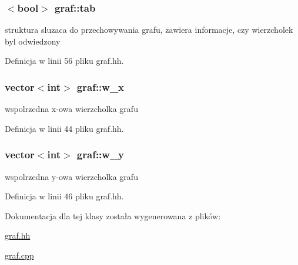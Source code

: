 \hypertarget{classgraf_a563284d00331e414f9d124da73e43dd6}{
\subsubsection[{tab}]{$<$bool$>$ graf\-::tab\hspace{0.3cm}{\ttfamily [private]}}}\label{classgraf_a563284d00331e414f9d124da73e43dd6}


struktura sluzaca do przechowywania grafu, zawiera informacje, czy wierzcholek byl odwiedzony 



Definicja w linii 56 pliku graf.\-hh.

\hypertarget{classgraf_add49fee88b9df326c31bb81318f8bb39}{
\subsubsection[{w\-\_\-x}]{\setlength{\rightskip}{0pt plus 5cm}vector$<$int$>$ graf\-::w\-\_\-x\hspace{0.3cm}{\ttfamily [private]}}}\label{classgraf_add49fee88b9df326c31bb81318f8bb39}


wspolrzedna x-\/owa wierzcholka grafu 



Definicja w linii 44 pliku graf.\-hh.

\hypertarget{classgraf_a43cbf9a972dc7cad492fb8fc811a51d1}{
\subsubsection[{w\-\_\-y}]{\setlength{\rightskip}{0pt plus 5cm}vector$<$int$>$ graf\-::w\-\_\-y\hspace{0.3cm}{\ttfamily [private]}}}\label{classgraf_a43cbf9a972dc7cad492fb8fc811a51d1}


wspolrzedna y-\/owa wierzcholka grafu 



Definicja w linii 46 pliku graf.\-hh.



Dokumentacja dla tej klasy została wygenerowana z plików\-:\begin{DoxyCompactItemize}
\item 
\hyperlink{graf_8hh}{graf.\-hh}\item 
\hyperlink{graf_8cpp}{graf.\-cpp}\end{DoxyCompactItemize}
